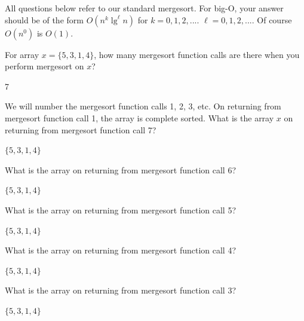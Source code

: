 

All questions below refer to our standard mergesort.
For big-O,
your answer should be of the form $O(n^k \lg^\ell n)$ for
$k=0, 1, 2, ...$.
$\ell=0, 1, 2, ...$.
Of course $O(n^0)$ is $O(1)$.

\nextq
For array $x = \{ 5, 3, 1, 4 \}$, how many mergesort function calls
are there when you perform mergesort on $x$?
\\
\ANSWER
\begin{answerlong}
7
\end{answerlong}

\nextq
We will number the mergesort function calls 1, 2, 3, etc.
On returning from mergesort function call 1, the array is complete sorted.
What is the array $x$ on returning from mergesort function call 7?
\\
\ANSWER
\begin{answerlong}
$\{ 5, 3, 1, 4 \}$
\end{answerlong}

\nextq
What is the array on returning from mergesort function call 6?
\\
\ANSWER
\begin{answerlong}
$\{ 5, 3, 1, 4 \}$
\end{answerlong}

\nextq
What is the array on returning from mergesort function call 5?
\\
\ANSWER
\begin{answerlong}
$\{ 5, 3, 1, 4 \}$
\end{answerlong}

\nextq
What is the array on returning from mergesort function call 4?
\\
\ANSWER
\begin{answerlong}
$\{ 5, 3, 1, 4 \}$
\end{answerlong}

\nextq
What is the array on returning from mergesort function call 3?
\\
\ANSWER
\begin{answerlong}
$\{ 5, 3, 1, 4 \}$
\end{answerlong}

